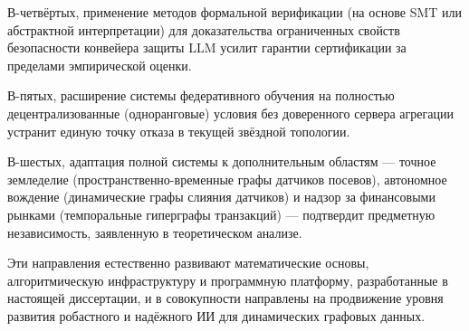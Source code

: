 В-четвёртых, применение методов формальной верификации (на основе SMT или абстрактной интерпретации) для доказательства ограниченных свойств безопасности конвейера защиты LLM усилит гарантии сертификации за пределами эмпирической оценки.

В-пятых, расширение системы федеративного обучения на полностью децентрализованные (одноранговые) условия без доверенного сервера агрегации устранит единую точку отказа в текущей звёздной топологии.

В-шестых, адаптация полной системы к дополнительным областям --- точное земледелие (пространственно-временные графы датчиков посевов), автономное вождение (динамические графы слияния датчиков) и надзор за финансовыми рынками (темпоральные гиперграфы транзакций) --- подтвердит предметную независимость, заявленную в теоретическом анализе.

Эти направления естественно развивают математические основы, алгоритмическую инфраструктуру и программную платформу, разработанные в настоящей диссертации, и в совокупности направлены на продвижение уровня развития робастного и надёжного ИИ для динамических графовых данных.

